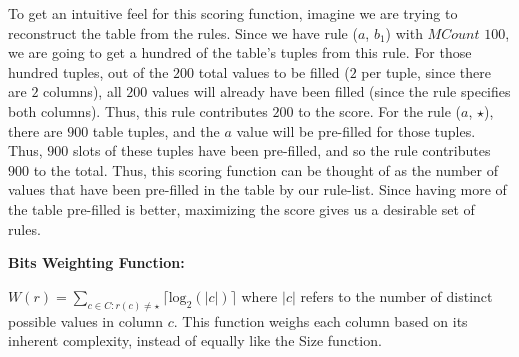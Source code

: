 \documentclass[10pt,journal,compsoc]{IEEEtran}
\newcommand{\stitle}[1]{\vspace{0.5em}\noindent\textbf{#1}}
\newcommand{\papertext}[1]{}
\newcommand{\techreporttext}[1]{#1}
\begin{document}
\techreporttext{To get an intuitive feel for this scoring function, imagine we are trying to reconstruct the table from the rules. Since we have rule ($a$, $b_1$) with $MCount$ $100$, we are going to get a hundred of the table's tuples from this rule. For those hundred tuples, out of the $200$ total values to be filled ($2$ per tuple, since there are $2$ columns), all $200$ values will already have been filled (since the rule specifies both columns). Thus, this rule contributes $200$ to the score. For the rule ($a$, $\star$), there are $900$ table tuples, and the $a$ value will be pre-filled for those tuples. Thus, $900$ slots of these tuples have been pre-filled, and so the rule contributes $900$ to the total. Thus, this scoring function can be thought of as the number of values that have been pre-filled in the table by our rule-list. Since having more of the table pre-filled is better, maximizing the score gives us a desirable set of rules.}

\stitle{Bits Weighting Function:}

$W(r) = \sum_{c \in C : r(c) \neq \star} \lceil \text{log}_2(|c|) \rceil$ where $|c|$ refers to the number of distinct possible values in column $c$. This function weighs each column based on its inherent complexity, instead of equally like the Size function.
\end{document}
